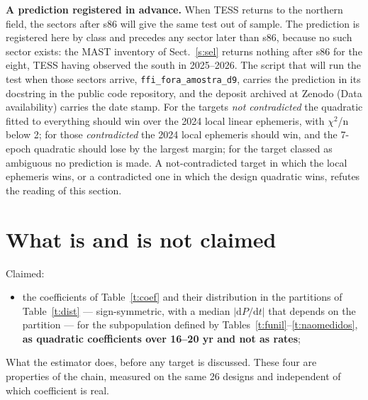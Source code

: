 \documentclass{aa}
\begin{document}
\textbf{A prediction registered in advance.} When TESS returns to the northern field, the sectors after s86 will give the same test out of sample. The prediction is registered here by class and precedes any sector later than s86, because no such sector exists: the MAST inventory of Sect.~\ref{s:sel} returns nothing after s86 for the eight, TESS having observed the south in 2025--2026. The script that will run the test when those sectors arrive, \texttt{ffi\_\allowbreak fora\_\allowbreak amostra\_\allowbreak d9}, carries the prediction in its docstring in the public code repository, and the deposit archived at Zenodo (Data availability) carries the date stamp. For the targets \textit{not contradicted} the quadratic fitted to everything should win over the 2024 local linear ephemeris, with $\chi^2$/n below 2; for those \textit{contradicted} the 2024 local ephemeris should win, and the 7-epoch quadratic should lose by the largest margin; for the target classed as ambiguous no prediction is made. A not-contradicted target in which the local ephemeris wins, or a contradicted one in which the design quadratic wins, refutes the reading of this section.


\section{What is and is not claimed}\label{s:claim}
Claimed:

\begin{itemize}
\item the coefficients of Table~\ref{t:coef} and their distribution in the partitions of Table~\ref{t:dist} --- sign-symmetric, with a median $|\mathrm{d}P/\mathrm{d}t|$ that depends on the partition --- for the subpopulation defined by Tables~\ref{t:funil}--\ref{t:naomedidos}, \textbf{as quadratic coefficients over 16--20 yr and not as rates};
\end{itemize}

What the estimator does, before any target is discussed. These four are properties of the chain, measured on the same 26 designs and independent of which coefficient is real.
\end{document}
